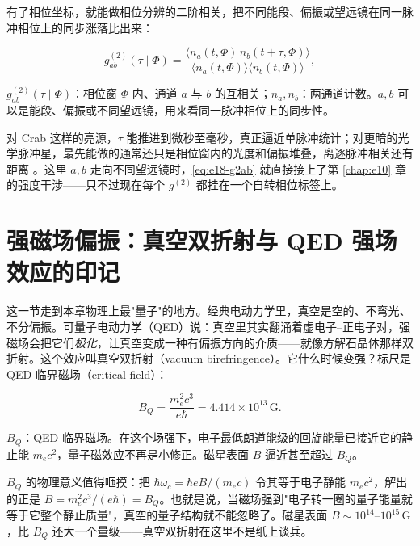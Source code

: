 有了相位坐标，就能做相位分辨的二阶相关，把不同能段、偏振或望远镜在同一脉冲相位上的同步涨落比出来：

\begin{equation}
  g^{(2)}_{ab}(\tau\mid\Phi)=
  \frac{\langle n_a(t,\Phi)\,n_b(t+\tau,\Phi)\rangle}
       {\langle n_a(t,\Phi)\rangle\langle n_b(t,\Phi)\rangle},
  \label{eq:e18-g2ab}
\end{equation}
\begin{formulaexplain}
\(g^{(2)}_{ab}(\tau\mid\Phi)\)：相位窗 \(\Phi\) 内、通道 \(a\) 与 \(b\) 的互相关；\(n_a,n_b\)：两通道计数。\(a,b\) 可以是能段、偏振或不同望远镜，用来看同一脉冲相位上的同步性。
\end{formulaexplain}

对 Crab 这样的亮源，\(\tau\) 能推进到微秒至毫秒，真正逼近单脉冲统计；对更暗的光学脉冲星，最先能做的通常还只是相位窗内的光度和偏振堆叠，离逐脉冲相关还有距离 \citep{1996ApJ...468..779M,2000ApJ...537..861S,2009MNRAS.397..103S}。这里 \(a,b\) 走向不同望远镜时，\eqref{eq:e18-g2ab} 就直接接上了第 \ref{chap:e10} 章的强度干涉——只不过现在每个 \(g^{(2)}\) 都挂在一个自转相位标签上。


\section{强磁场偏振：真空双折射与 QED 强场效应的印记}
\label{sec:e18-qed}

这一节走到本章物理上最"量子"的地方。经典电动力学里，真空是空的、不弯光、不分偏振。可量子电动力学（QED）说：真空里其实翻涌着虚电子–正电子对，强磁场会把它们\emph{极化}，让真空变成一种有偏振方向的介质——就像方解石晶体那样双折射。这个效应叫真空双折射（vacuum birefringence）。它什么时候变强？标尺是 QED 临界磁场（critical field）：

\begin{equation}
  B_Q=\frac{m_e^2c^3}{e\hbar}=4.414\times10^{13}\,\mathrm{G}.
  \label{eq:e18-bq}
\end{equation}
\begin{formulaexplain}
\(B_Q\)：QED 临界磁场。在这个场强下，电子最低朗道能级的回旋能量已接近它的静止能 \(m_ec^2\)，量子磁效应不再是小修正。磁星表面 \(B\) 逼近甚至超过 \(B_Q\)。
\end{formulaexplain}

\(B_Q\) 的物理意义值得咂摸：把 \(\hbar\omega_c=\hbar eB/(m_ec)\) 令其等于电子静能 \(m_ec^2\)，解出的正是 \(B=m_e^2c^3/(e\hbar)=B_Q\)。也就是说，当磁场强到"电子转一圈的量子能量就等于它整个静止质量"，真空的量子结构就不能忽略了。磁星表面 \(B\sim10^{14}\)–\(10^{15}\,\mathrm{G}\)，比 \(B_Q\) 还大一个量级——真空双折射在这里不是纸上谈兵。

